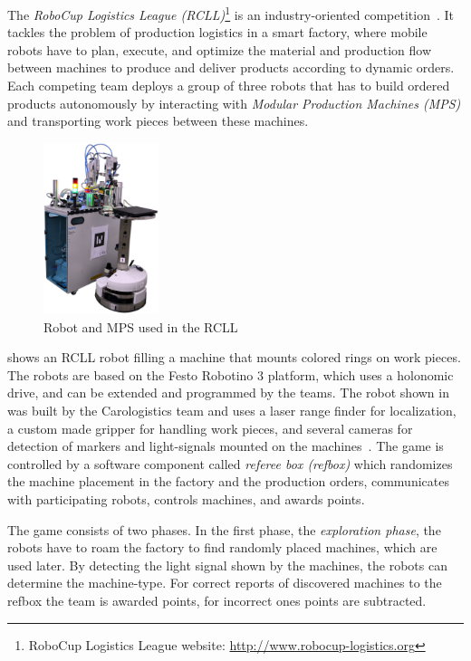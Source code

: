 The \emph{RoboCup Logistics League (RCLL)}\footnote{RoboCup Logistics
  League website: \url{http://www.robocup-logistics.org}} is an
industry-oriented competition~\cite{LLSF-Rules-2016}. It tackles the
problem of production logistics in a smart factory, where mobile
robots have to plan, execute, and optimize the material and production
flow between machines to produce and deliver products according to
dynamic orders. Each competing team deploys a group of three robots
that has to build ordered products autonomously by interacting with
\emph{Modular Production Machines (MPS)} and transporting work pieces
between these machines.
\begin{figure}
  \centering
  \vspace{-2.7ex}
  \includegraphics[width=0.3\textwidth]{img/rcll}
  \vspace{-4ex}
  \caption{Robot and MPS used in the RCLL~\cite{chapter-cps}}
  \label{fig:rcll}
\end{figure}
 shows an RCLL robot filling a machine that mounts
colored rings on work pieces. The robots are based on the Festo
Robotino 3 platform, which uses a holonomic drive, and can be extended
and programmed by the teams. The robot shown in  was
built by the Carologistics team and uses a laser range finder for
localization, a custom made gripper for handling work pieces, and
several cameras for detection of markers and light-signals mounted on
the machines~\cite{Carologistics2015,chapter-cps}. The game is
controlled by a software component called \emph{referee box (refbox)}
which randomizes the machine placement in the factory and the
production orders, communicates with participating robots, controls
machines, and awards points.

The game consists of two phases. In the first phase, the
\emph{exploration phase}, the robots have to roam the factory to find
randomly placed machines, which are used later. By detecting the
light signal shown by the machines, the robots can determine the
machine-type. For correct reports of discovered machines to the refbox
the team is awarded points, for incorrect ones points are subtracted.


